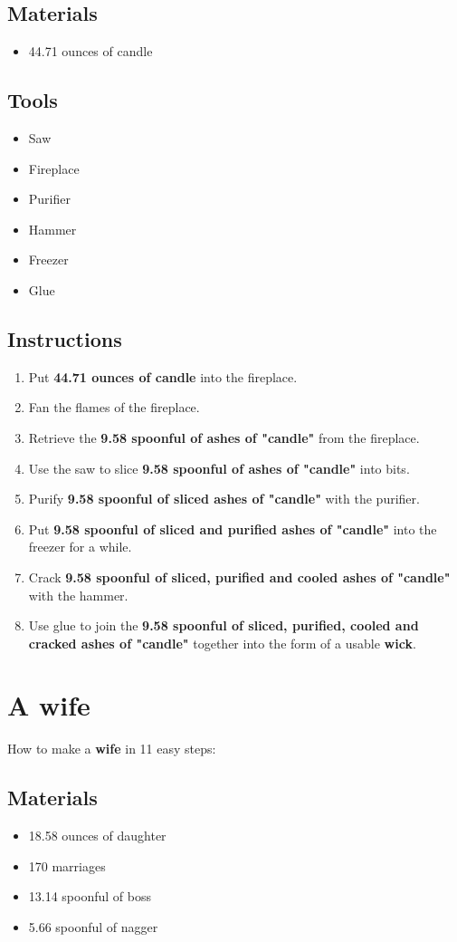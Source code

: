 \documentclass{article}
\begin{document}
\subsection{Materials}\begin{itemize}
\item 
44.71 ounces of candle
\end{itemize}
\subsection{Tools}\begin{itemize}
\item 
Saw
\item 
Fireplace
\item 
Purifier
\item 
Hammer
\item 
Freezer
\item 
Glue
\end{itemize}
\subsection{Instructions}\begin{enumerate}
\item 
Put \textbf{44.71 ounces of candle} into the fireplace.
\item 
Fan the flames of the fireplace.
\item 
Retrieve the \textbf{9.58 spoonful of ashes of "candle"} from the fireplace.
\item 
Use the saw to slice \textbf{9.58 spoonful of ashes of "candle"} into bits.
\item 
Purify \textbf{9.58 spoonful of sliced ashes of "candle"} with the purifier.
\item 
Put \textbf{9.58 spoonful of sliced and purified ashes of "candle"} into the freezer for a while.
\item 
Crack \textbf{9.58 spoonful of sliced, purified and cooled ashes of "candle"} with the hammer.
\item 
Use glue to join the \textbf{9.58 spoonful of sliced, purified, cooled and cracked ashes of "candle"} together into the form of a usable \textbf{wick}.
\end{enumerate}
\newpage
\section{A wife}How to make a \textbf{wife} in 11 easy steps:

\subsection{Materials}\begin{itemize}
\item 
18.58 ounces of daughter
\item 
170 marriages
\item 
13.14 spoonful of boss
\item 
5.66 spoonful of nagger
\end{itemize}
\end{document}

